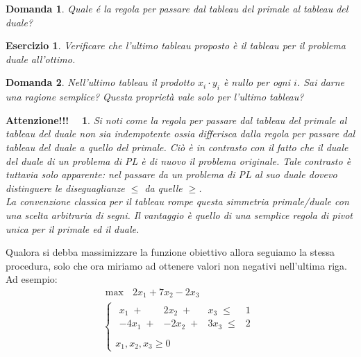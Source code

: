 \documentclass[10pt]{article}
\newtheorem{Dom}{Domanda}%
\newtheorem{Ese}{Esercizio}%
\newtheorem{Att}{Attenzione!!! \ }%
\begin{document}
\begin{Dom}
   Quale \'e la regola per passare dal tableau del primale
   al tableau del duale?
\end{Dom}

\begin{Ese}
   Verificare che l'ultimo tableau proposto
   \`e il tableau per il problema duale all'ottimo.
\end{Ese}

\begin{Dom}
   Nell'ultimo tableau il prodotto 
   $x_i\cdot y_i$ \`e nullo
   per ogni $i$. Sai darne una ragione semplice? 
   Questa propriet\`a vale solo per l'ultimo tableau?
\end{Dom}

\begin{Att}
   Si noti come la regola per passare dal tableau del primale
   al tableau del duale non sia indempotente ossia differisca
   dalla regola per passare dal tableau del duale a quello
   del primale.
   Ci\`o \`e in contrasto con il fatto che il duale del duale di un
   problema di PL \`e di nuovo il problema originale.
   Tale contrasto \`e tuttavia solo apparente: 
     nel passare da un problema di PL al suo duale
    dovevo distinguere le diseguaglianze $\leq$ da quelle $\geq$.\\ 
   La convenzione classica per il tableau rompe
   questa simmetria primale/duale con una scelta arbitraria di segni.
   Il vantaggio \`e quello di una semplice regola di pivot
   unica per il primale ed il duale.
\end{Att}

Qualora si debba massimizzare la funzione obiettivo
allora seguiamo la stessa procedura,
solo che ora miriamo ad ottenere valori non negativi nell'ultima riga.
Ad esempio:
\[
   \begin{array}{l}
        \max \mbox{\ }2x_1 + 7x_2 -2x_3\\
        \left\{
        \begin{array}{l}
        \begin{array}{rrrr}
             x_1 \;+&  2x_2 \;+&  x_3 \;\leq &   1 \\
           -4x_1 \;+& -2x_2 \;+& 3x_3 \;\leq &   2 \\
        \end{array} \\
        x_1, x_2, x_3  \geq 0    
        \end{array}
        \right.
   \end{array}
\]
\end{document}
